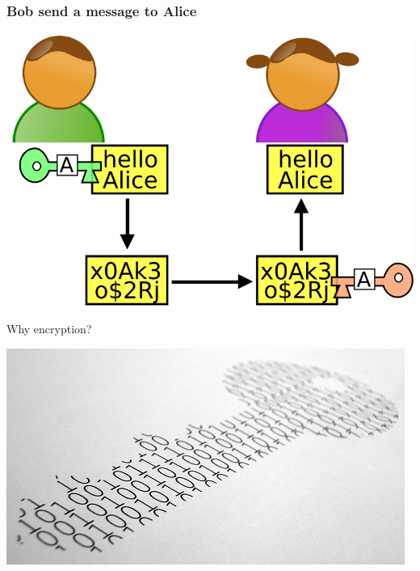 \begin{frame}
\frametitle{Bob send a message to Alice}
\begin{center}
\includegraphics[scale=0.3] {./materials/Alice_et_bob} 
\end{center}
\end{frame}


\begin{frame}
\Huge{\centerline{Why encryption?}}
\begin{center}
\includegraphics[scale=0.4] {./materials/cryptography.jpg} 
\end{center}
\end{frame}

